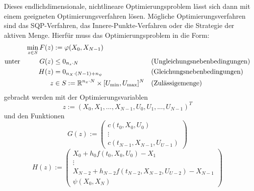 Dieses endlichdimensionale, nichtlineare Optimierungsproblem lässt sich dann mit einem geeigneten Optimierungsverfahren lösen. Mögliche Optimierungsverfahren sind das SQP-Verfahren, das Innere-Punkte-Verfahren oder die Strategie der aktiven Menge. Hierfür muss das Optimierungsproblem in die Form:
\begin{align*}
\min_{z \in S} F(z) &:= \varphi(X_0,X_{N-1}) & & \\
\text{unter} \hspace{10mm} G(z) &\leq 0_{n_s \cdot N} & &  \text{(Ungleichungsnebenbedingungen)} \\
H(z) &= 0_{n_X \cdot (N-1) + n_{\psi}} & & \text{(Gleichungsnebenbedingungen)}\\
z &\in S := \R^{n_x \cdot N} \times [U_{\min},U_{\max}]^{N} & &  \text{(Zulässigemenge)}
\end{align*}
gebracht werden mit der Optimierungsvariablen 
\begin{equation}
z := (X_0,X_1,...,X_{N-1},U_0,U_1,...,U_{N-1})^T
\end{equation}
und den Funktionen 
\begin{equation}
G(z) := \begin{pmatrix}
c(t_0,X_0,U_0) \\ 
\vdots \\ 
c(t_{N-1},X_{N-1},U_{U-1})
\end{pmatrix} 
\end{equation}
\begin{equation}
H(z) := \begin{pmatrix}
X_0 + h_0 f(t_0,X_0,U_0) - X_1 \\ 
\vdots \\ 
X_{N-2} + h_{N-2} f(t_{N-2},X_{N-2},U_{U-2}) - X_{N-1} \\
\psi(X_0,X_N)
\end{pmatrix} 
\end{equation}


